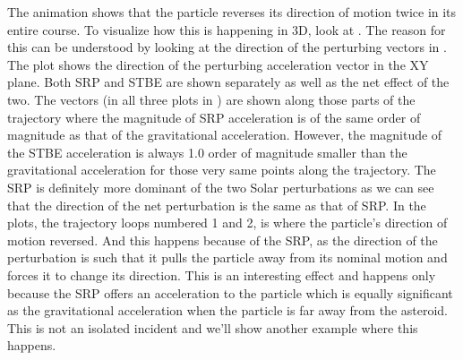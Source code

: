 The animation shows that the particle reverses its direction of motion twice in its entire course. To visualize how this is happening in 3D, look at . The reason for this can be understood by looking at the direction of the perturbing vectors in . The plot shows the direction of the perturbing acceleration vector in the XY plane. Both \gls{SRP} and \gls{STBE} are shown separately as well as the net effect of the two. The vectors (in all three plots in ) are shown along those parts of the trajectory where the magnitude of \gls{SRP} acceleration is of the same order of magnitude as that of the gravitational acceleration. However, the magnitude of the \gls{STBE} acceleration is always 1.0 order of magnitude smaller than the gravitational acceleration for those very same points along the trajectory. The \gls{SRP} is definitely more dominant of the two Solar perturbations as we can see that the direction of the net perturbation is the same as that of \gls{SRP}. In the plots, the trajectory loops numbered 1 and 2, is where the particle's direction of motion reversed. And this happens because of the \gls{SRP}, as the direction of the perturbation is such that it pulls the particle away from its nominal motion and forces it to change its direction. This is an interesting effect and happens only because the \gls{SRP} offers an acceleration to the particle which is equally significant as the gravitational acceleration when the particle is far away from the asteroid. This is not an isolated incident and we'll show another example where this happens.

